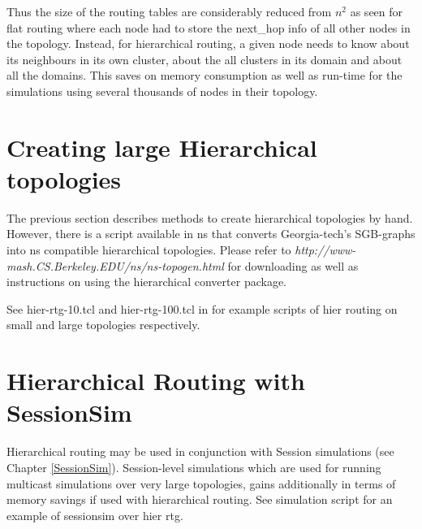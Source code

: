 Thus the size of the routing tables are considerably reduced from 
$n^{2}$ as seen for flat routing where each node had to store the
  next\_hop info of all other nodes in the topology. Instead, for
  hierarchical routing, a given node needs to know about its neighbours
  in its own cluster, about the all clusters in its domain and about all
  the domains. This saves on memory consumption as well as run-time for
  the simulations using several thousands of nodes in their topology.


\section{Creating large Hierarchical topologies}
\label{large-hier-topo}
The previous section describes methods to create hierarchical topologies
by hand. However, there is a script available in ns that converts
Georgia-tech's SGB-graphs into ns compatible hierarchical topologies.
Please refer to {\em http://www-mash.CS.Berkeley.EDU/ns/ns-topogen.html}
for downloading as well as instructions on using the hierarchical
converter package. 

See hier-rtg-10.tcl and hier-rtg-100.tcl in  for example
scripts of hier routing on small and large topologies
respectively. 

\section{Hierarchical Routing with SessionSim}
\label{sec:hier-rtg-with-sessionsim}

Hierarchical routing may be used in conjunction with Session simulations
(see Chapter \ref{SessionSim}). Session-level simulations which are used
for running multicast simulations over very large topologies, gains
additionally in terms of memory savings if used with hierarchical
routing. See simulation script 
for an example of sessionsim over hier rtg.

\endinput
